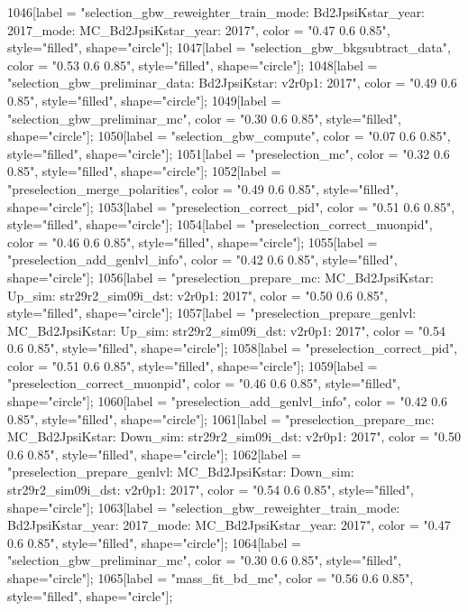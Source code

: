 {	1046[label = "selection_gbw_reweighter_train\ndata_mode: Bd2JpsiKstar\ndata_year: 2017\nmc_mode: MC_Bd2JpsiKstar\nmc_year: 2017", color = "0.47 0.6 0.85", style="filled", shape="circle"];
	1047[label = "selection_gbw_bkgsubtract_data", color = "0.53 0.6 0.85", style="filled", shape="circle"];
	1048[label = "selection_gbw_preliminar_data\nmode: Bd2JpsiKstar\nversion: v2r0p1\nyear: 2017", color = "0.49 0.6 0.85", style="filled", shape="circle"];
	1049[label = "selection_gbw_preliminar_mc", color = "0.30 0.6 0.85", style="filled", shape="circle"];
	1050[label = "selection_gbw_compute", color = "0.07 0.6 0.85", style="filled", shape="circle"];
	1051[label = "preselection_mc", color = "0.32 0.6 0.85", style="filled", shape="circle"];
	1052[label = "preselection_merge_polarities", color = "0.49 0.6 0.85", style="filled", shape="circle"];
	1053[label = "preselection_correct_pid", color = "0.51 0.6 0.85", style="filled", shape="circle"];
	1054[label = "preselection_correct_muonpid", color = "0.46 0.6 0.85", style="filled", shape="circle"];
	1055[label = "preselection_add_genlvl_info", color = "0.42 0.6 0.85", style="filled", shape="circle"];
	1056[label = "preselection_prepare_mc\nmode: MC_Bd2JpsiKstar\npolarity: Up\nstrip_sim: str29r2_sim09i_dst\nversion: v2r0p1\nyear: 2017", color = "0.50 0.6 0.85", style="filled", shape="circle"];
	1057[label = "preselection_prepare_genlvl\nmode: MC_Bd2JpsiKstar\npolarity: Up\nstrip_sim: str29r2_sim09i_dst\nversion: v2r0p1\nyear: 2017", color = "0.54 0.6 0.85", style="filled", shape="circle"];
	1058[label = "preselection_correct_pid", color = "0.51 0.6 0.85", style="filled", shape="circle"];
	1059[label = "preselection_correct_muonpid", color = "0.46 0.6 0.85", style="filled", shape="circle"];
	1060[label = "preselection_add_genlvl_info", color = "0.42 0.6 0.85", style="filled", shape="circle"];
	1061[label = "preselection_prepare_mc\nmode: MC_Bd2JpsiKstar\npolarity: Down\nstrip_sim: str29r2_sim09i_dst\nversion: v2r0p1\nyear: 2017", color = "0.50 0.6 0.85", style="filled", shape="circle"];
	1062[label = "preselection_prepare_genlvl\nmode: MC_Bd2JpsiKstar\npolarity: Down\nstrip_sim: str29r2_sim09i_dst\nversion: v2r0p1\nyear: 2017", color = "0.54 0.6 0.85", style="filled", shape="circle"];
	1063[label = "selection_gbw_reweighter_train\ndata_mode: Bd2JpsiKstar\ndata_year: 2017\nmc_mode: MC_Bd2JpsiKstar\nmc_year: 2017", color = "0.47 0.6 0.85", style="filled", shape="circle"];
	1064[label = "selection_gbw_preliminar_mc", color = "0.30 0.6 0.85", style="filled", shape="circle"];
	1065[label = "mass_fit_bd_mc", color = "0.56 0.6 0.85", style="filled", shape="circle"];
}
